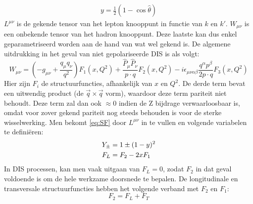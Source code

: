 \documentclass[a4paper,11pt]{article}
\numberwithin{equation}{section} %
\begin{document}
\begin{align}
y = \frac{1}{2} \left( 1-\cos{\hat{\theta}} \right)
\end{align}
$L^{\mu \nu}$ is de gekende tensor van het lepton knooppunt in functie van $k$ en $k'$.
$W_{\mu \nu}$ is een onbekende tensor van het hadron knooppunt.
Deze laatste kan dus enkel geparametriseerd worden aan de hand van wat wel gekend is.
De algemene uitdrukking in het geval van niet gepolariseerde DIS is als volgt:
\begin{equation}
W_{\mu \nu} = \left( -g_{\mu \nu} + \frac{q_\mu q_\nu}{q^2} \right) F_1(x,Q^2) + \frac{\hat{P}_\mu \hat{P}_\nu}{p \cdot q} F_2(x,Q^2) -  i\epsilon_{\mu \nu \alpha \beta} \frac{q^\alpha p^\beta}{2p \cdot q} F_3(x,Q^2)
\end{equation}
Hier zijn $F_i$ de structuurfuncties, afhankelijk van $x$ en $Q^2$.
De derde term bevat een uitwendig product (de $\vec{q} \times \vec{q}$ vorm), waardoor deze term pariteit niet behoudt.
Deze term zal dan ook $\approx 0$ indien de Z bijdrage verwaarloosbaar is, omdat voor zover gekend pariteit nog steeds behouden is voor de sterke wisselwerking.
Men bekomt \eqref{eq:SF} door $L^{\mu \nu}$ in te vullen en volgende variabelen te definiëren:
\begin{align}
Y_\pm &= 1 \pm (1-y)^2 \notag \\
F_L &= F_2 - 2x F_1 \notag
\end{align}
In DIS processen, kan men vaak uitgaan van $F_L = 0$, zodat $F_2$ in dat geval voldoende is om de hele werkzame doorsnede te bepalen.
De longitudinale en transversale structuurfuncties hebben het volgende verband met $F_2$ en $F_1$:
\begin{equation}
F_2 = F_L + F_T
\end{equation}
\end{document}
